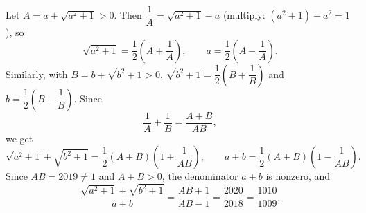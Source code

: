 Let $A=a+\sqrt{a^2+1}>0$. Then $\dfrac{1}{A}=\sqrt{a^2+1}-a$ (multiply: $(a^2+1)-a^2=1$), so
\[
\sqrt{a^2+1}=\dfrac{1}{2}\left(A+\dfrac{1}{A}\right),\qquad a=\dfrac{1}{2}\left(A-\dfrac{1}{A}\right).
\]
Similarly, with $B=b+\sqrt{b^2+1}>0$, $\sqrt{b^2+1}=\dfrac{1}{2}\left(B+\dfrac{1}{B}\right)$ and $b=\dfrac{1}{2}\left(B-\dfrac{1}{B}\right)$. Since
\[
\dfrac{1}{A}+\dfrac{1}{B}=\dfrac{A+B}{AB},
\]
we get
\[
\sqrt{a^2+1}+\sqrt{b^2+1}=\dfrac{1}{2}(A+B)\left(1+\dfrac{1}{AB}\right),\qquad a+b=\dfrac{1}{2}(A+B)\left(1-\dfrac{1}{AB}\right).
\]
Since $AB=2019\ne1$ and $A+B>0$, the denominator $a+b$ is nonzero, and
\[
\dfrac{\sqrt{a^2+1}+\sqrt{b^2+1}}{a+b}=\dfrac{AB+1}{AB-1}=\dfrac{2020}{2018}=\boxed{\dfrac{1010}{1009}} .
\]
